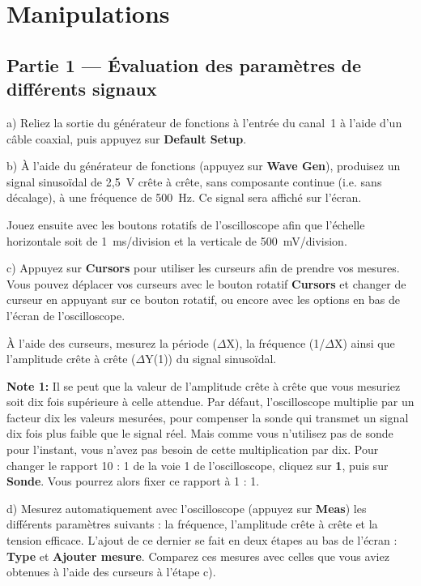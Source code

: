 \documentclass[canadien,12pt,oneside,letterpaper]{article}
\begin{document}
\section{Manipulations}

\setlength{\parskip}{1ex plus 0.5ex minus 0.2ex}


\subsection{Partie 1 --- Évaluation des paramètres de différents signaux}

a) Reliez la sortie du générateur de fonctions à l'entrée du canal~1 à l'aide d'un câble coaxial, puis appuyez sur \textbf{Default Setup}.

b) À l'aide du générateur de fonctions (appuyez sur \textbf{Wave Gen}), produisez un signal sinusoïdal de 2,5~V crête à crête, sans composante continue (i.e. sans décalage), à une fréquence de 500~Hz. Ce signal sera affiché sur l'écran.

Jouez ensuite avec les boutons rotatifs de l'oscilloscope afin que l'échelle horizontale soit de 1~ms/division et la verticale de 500~mV/division.

c) Appuyez sur \textbf{Cursors} pour utiliser les curseurs afin de prendre vos mesures. Vous pouvez déplacer vos curseurs avec le bouton rotatif \textbf{Cursors} et changer de curseur en appuyant sur ce bouton rotatif, ou encore avec les options en bas de l'écran de l'oscilloscope.

À l'aide des curseurs, mesurez la période ($\Delta$X), la fréquence (1/$\Delta$X) ainsi que l'amplitude crête à crête ($\Delta$Y(1)) du signal sinusoïdal.

\textbf{Note 1:} Il se peut que la valeur de l'amplitude crête à crête que vous mesuriez soit dix fois supérieure à celle attendue. Par défaut, l'oscilloscope multiplie par un facteur dix les valeurs mesurées, pour compenser la sonde qui transmet un signal dix fois plus faible que le signal réel. Mais comme vous n'utilisez pas de sonde pour l'instant, vous n'avez pas besoin de cette multiplication par dix. Pour changer le rapport 10 : 1 de la voie 1 de l'oscilloscope, cliquez sur \textbf{1}, puis sur \textbf{Sonde}. Vous pourrez alors fixer ce rapport à 1 : 1.

d) Mesurez automatiquement avec l'oscilloscope (appuyez sur \textbf{Meas}) les différents paramètres suivants : la fréquence, l'amplitude crête à crête et la tension efficace. L'ajout de ce dernier se fait en deux étapes au bas de l'écran : \textbf{Type} et \textbf{Ajouter mesure}. Comparez ces mesures avec celles que vous aviez obtenues à l'aide des curseurs à l'étape c).
\end{document}
